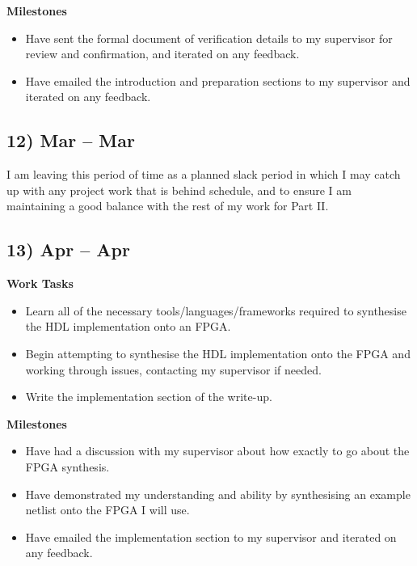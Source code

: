 \documentclass[10pt,a4paper]{article}
\begin{document}
\textbf{Milestones}
\begin{itemize}
	\item Have sent the formal document of verification details to my supervisor for review and confirmation, and iterated on any feedback.
	\item Have emailed the introduction and preparation sections to my supervisor and iterated on any feedback.
\end{itemize}

\subsection*{12)  Mar --  Mar}
I am leaving this period of time as a planned slack period in which I may catch up with any project work that is behind schedule, and to ensure I am maintaining a good balance with the rest of my work for Part II.

\subsection*{13)  Apr --  Apr}
\textbf{Work Tasks}
\begin{itemize}
	\item Learn all of the necessary tools/languages/frameworks required to synthesise the HDL implementation onto an FPGA.
	\item Begin attempting to synthesise the HDL implementation onto the FPGA and working through issues, contacting my supervisor if needed.
	\item Write the implementation section of the write-up.
\end{itemize}

\textbf{Milestones}
\begin{itemize}
	\item Have had a discussion with my supervisor about how exactly to go about the FPGA synthesis.
	\item Have demonstrated my understanding and ability by synthesising an example netlist onto the FPGA I will use.
	\item Have emailed the implementation section to my supervisor and iterated on any feedback.
\end{itemize}
\end{document}
